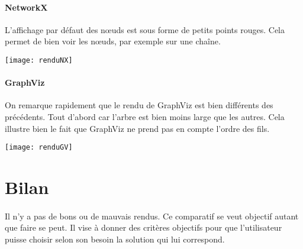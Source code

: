 \begin{center}

\end{center}

\paragraph{NetworkX} L'affichage par défaut des n\oe uds est sous forme de petits points rouges. Cela permet de bien voir les n\oe uds, par exemple sur une chaîne.

\begin{center}
\texttt{[image: renduNX]}
\end{center}
	
\paragraph{GraphViz} On remarque rapidement que le rendu de GraphViz est bien différents des précédents. Tout d'abord car l'arbre est bien moins large que les autres. Cela illustre bien le fait que GraphViz ne prend pas en compte l'ordre des fils.

\begin{center}
\texttt{[image: renduGV]}
\end{center}

	\section{Bilan}
	
\paragraph{} Il n'y a pas de bons ou de mauvais rendus. Ce comparatif se veut objectif autant que faire se peut. Il vise à donner des critères objectifs pour que l'utilisateur puisse choisir selon son besoin la solution qui lui correspond.